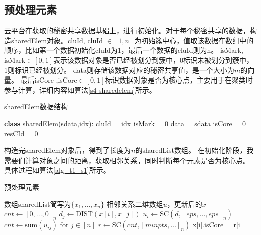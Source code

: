 \subsection{预处理元素}
云平台在获取的秘密共享数据基础上，进行初始化。对于每个秘密共享的数据，构造sharedElem对象。cluId, cluId $ \in [1, n]$为初始簇中心，值取该数据在数组中的顺序，比如第一个数据初始化cluId为1，最后一个数据的cluId则为n。
isMark, isMark$ \in [0,1] $表示该数据对象是否已经被划分到簇中，0标识未被划分到簇中，1则标识已经被划分。
data则存储该数据对应的秘密共享值，是一个大小为$ m $的向量。
最后isCore ,isCore$ \in[0,1]$标识数据对象是否为核心点，主要用于在聚类时参与计算，详细内容如算法\ref{s4-sharedelem}所示。
\begin{algorithm}
	\caption{sharedElem数据结构}
	\label{s4-sharedelem}
	\begin{algorithmic}[1]
		\STATE \textbf{class} sharedElem(sdata,idx):
		\STATE \hspace{\algorithmicindent} cluId = idx
		\STATE \hspace{\algorithmicindent} isMark = 0
		\STATE \hspace{\algorithmicindent} data = sdata
		\STATE \hspace{\algorithmicindent} isCore = 0
		\STATE \hspace{\algorithmicindent} resCId = 0
	\end{algorithmic}
\end{algorithm}

构造完sharedElem对象后，得到了长度为$ n $的sharedList数组。
在初始化阶段，我需要们计算对象之间的距离，获取相邻关系，同时判断每个元素是否为核心点。
具体过程如算法\ref{alg_t1_s1}所示。

\begin{algorithm}[htbp]
	\renewcommand{\algorithmicrequire}{\textbf{输入:}}
	\renewcommand{\algorithmicensure}{\textbf{输出:}}
	\caption{预处理元素}
	\label{alg_t1_s1}
	\begin{algorithmic}[1]
		\REQUIRE 数组sharedList简写为$ \{x_1,...,x_n\} $
		\ENSURE 相邻关系二维数组$ u $，更新后的$ x $
		\STATE $ cnt \leftarrow [0,...,0]_n $
		\STATE $ d_{j} \leftarrow \text{DIST}(x[i], x[j]) $
		\ENDFOR
		\STATE $ u_i \leftarrow \text{SC}(d, [eps,...,eps]_n) $
		\STATE $ cnt \leftarrow \text{sum}(u_{ij})$ for $j \in [n] $
		\ENDFOR
		\STATE $ r \leftarrow \text{SC}(cnt, [minpts,...]_n) $
		\STATE x[i].isCore = r[i]
		\ENDFOR
	\end{algorithmic}
\end{algorithm}


